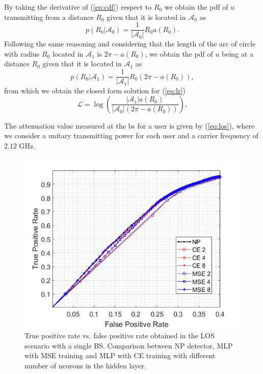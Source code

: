 \documentclass[draftcls,onecolumn,12pt]{IEEEtran}
\begin{document}
By taking the derivative of (\ref{eq:cdf}) respect to $R_0$ we obtain the \ac{pdf} of $u$ transmitting from a distance $R_0$ given that it is located in $\mathcal{A}_0$ as
\begin{equation}
    p(R_0|\mathcal{A}_0) = \frac{1}{|\mathcal{A}_0|}R_0a(R_0).
\end{equation}
Following the same reasoning and considering that the length of the arc of circle with radius $R_0$ located in $\mathcal{A}_1$ is $2\pi - a(R_0)$, we obtain the \ac{pdf} of $u$ being at a distance $R_0$ given that it is located in $\mathcal{A}_1$ as
\begin{equation}
     p(R_0|\mathcal{A}_1) = \frac{1}{|\mathcal{A}_1|}R_0\left(2\pi-a(R_0)\right),
\end{equation}
from which we obtain the closed form solution for (\ref{eq:lr}) 
\begin{equation}
    \mathcal{L}=\log\left(\frac{|\mathcal{A}_1|a(R_0)}{|\mathcal{A}_0|\left(2\pi-a(R_0)\right)}\right),
\end{equation}

The attenuation value measured at the \ac{bs} for a user is given by (\ref{eq:los}), where we consider a unitary transmitting power for each user and a carrier frequency of $2.12$ GHz.
\begin{figure}[h]
    \centering
    \includegraphics[width=0.5\columnwidth]{mseVSce.jpg}
    \caption{True positive rate vs. false positive rate obtained in the LOS scenario with a single BS. Comparison between NP detector, MLP with MSE training and MLP with CE training with different number of neurons in the hidden layer.}
    \label{fig:ceVSmse}
\end{figure}
\end{document}
